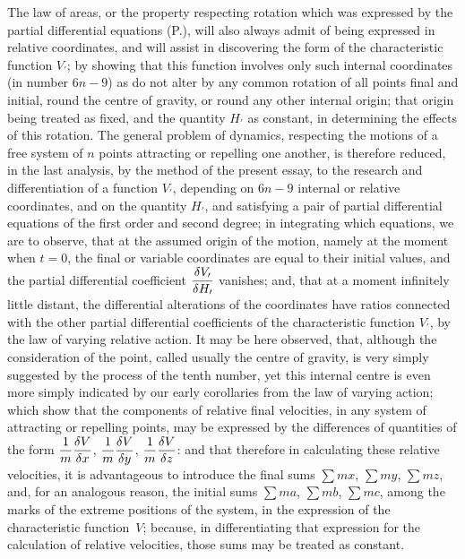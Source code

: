 The law of areas, or the property respecting rotation which was
expressed by the partial differential equations (P.), will also
always admit of being expressed in relative coordinates, and will
assist in discovering the form of the characteristic function
$V_\prime$; by showing that this function involves only such
internal coordinates (in number $6n - 9$) as do not alter by any
common rotation of all points final and initial, round the centre
of gravity, or round any other internal origin; that origin being
treated as fixed, and the quantity $H_\prime$ as constant, in
determining the effects of this rotation.  The general problem of
dynamics, respecting the motions of a free system of $n$ points
attracting or repelling one another, is therefore reduced, in the
last analysis, by the method of the present essay, to the
research and differentiation of a function $V_\prime$, depending
on $6n - 9$ internal or relative coordinates, and on the quantity
$H_\prime$, and satisfying a pair of partial differential
equations of the first order and second degree; in integrating
which equations, we are to observe, that at the assumed origin of
the motion, namely at the moment when $t = 0$, the final or
variable coordinates are equal to their initial values, and the
partial differential coefficient
$\displaystyle {\delta V_\prime \over \delta H_\prime}$
vanishes; and, that at a moment infinitely little distant, the
differential alterations of the coordinates have ratios connected
with the other partial differential coefficients of the
characteristic function $V_\prime$, by the law of varying
relative action.  It may be here observed, that, although the
consideration of the point, called usually the centre of gravity,
is very simply suggested by the process of the tenth number, yet
this internal centre is even more simply indicated by our early
corollaries from the law of varying action; which show that the
components of relative final velocities, in any system of
attracting or repelling points, may be expressed by the
differences of quantities of the form
$\displaystyle {1 \over m} {\delta V \over \delta x}$,
$\displaystyle {1 \over m} {\delta V \over \delta y}$,
$\displaystyle {1 \over m} {\delta V \over \delta z}$:
and that therefore in calculating these relative velocities, it
is advantageous to introduce the final sums
$\sum m x$, $\sum m y$, $\sum m z$,
and, for an analogous reason, the initial sums
$\sum m a$, $\sum m b$, $\sum m c$,
among the marks of the extreme positions of the system, in the
expression of the characteristic function~$V$; because, in
differentiating that expression for the calculation of relative
velocities, those sums may be treated as constant.

